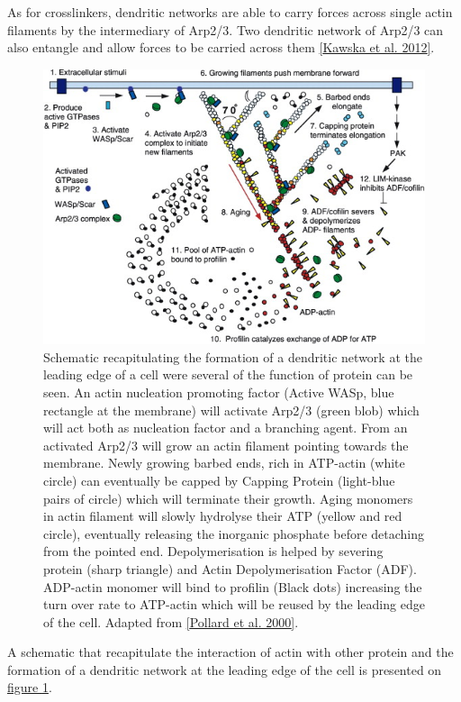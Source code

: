 \documentclass[A4paperpaper,11pt,english]{sphinxmanual}
\begin{document}
As for crosslinkers, dendritic networks are able to carry forces across single
actin filaments by the intermediary of Arp2/3. Two dendritic network of Arp2/3
can also entangle and allow forces to be carried across them
{\hyperref[index-latex:kawska2012]{{[}Kawska et al. 2012{]}}}.
\begin{figure}[htbp]
\centering
\capstart

\includegraphics[width=0.700\linewidth]{pollard2003-actin-cycle.jpg}
\caption{Schematic recapitulating the formation of
a dendritic network at the leading edge of a cell were several of the
function of protein can be seen. An actin nucleation promoting factor
(Active WASp,  blue rectangle at the membrane) will activate Arp2/3 (green
blob) which will act both as nucleation factor and a branching agent. From
an activated Arp2/3 will grow an actin filament pointing towards the
membrane. Newly growing barbed ends, rich in ATP-actin (white circle) can
eventually be capped by Capping Protein (light-blue pairs of circle) which
will terminate their growth.  Aging monomers in actin filament will slowly
hydrolyse their ATP (yellow and red circle), eventually releasing the
inorganic phosphate before detaching from the pointed end.
Depolymerisation is helped by severing protein (sharp triangle) and Actin
Depolymerisation Factor (ADF). ADP-actin monomer will bind to profilin
(Black dots) increasing the turn over rate to ATP-actin which will be reused
by the leading edge of the cell. Adapted from {\hyperref[index-latex:pollard2000]{{[}Pollard et al. 2000{]}}}.}\label{index-latex:actin-cycle}\end{figure}

A schematic that recapitulate the interaction of actin with other protein and
the formation of a dendritic network at the leading edge of the cell is
presented on \hyperref[index-latex:actin-cycle]{figure  \ref*{index-latex:actin-cycle}}.
\end{document}
